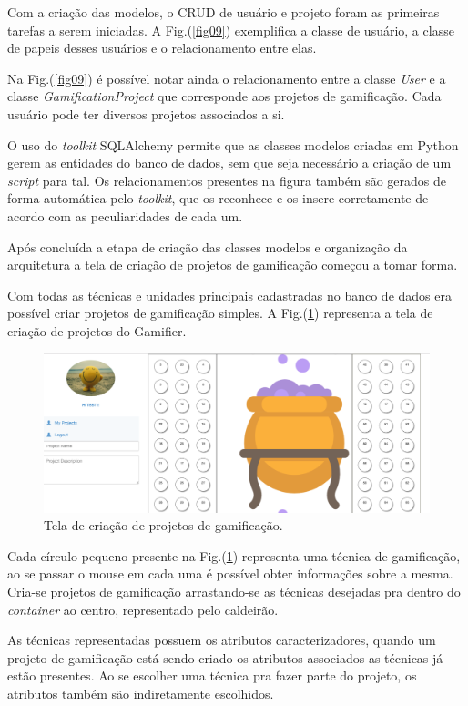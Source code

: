 Com a criação das modelos, o CRUD de usuário e projeto foram as primeiras tarefas a serem iniciadas. A Fig.(\ref{fig09}) exemplifica a classe de usuário, a classe de papeis desses usuários e o relacionamento entre elas. 

Na Fig.(\ref{fig09}) é possível notar ainda o relacionamento entre a classe \textit{User} e a classe \textit{GamificationProject} que corresponde aos projetos de gamificação. Cada usuário pode ter diversos projetos associados a si.


O uso do \textit{toolkit} SQLAlchemy  permite que as classes modelos criadas em Python gerem as entidades do banco de dados, sem que seja necessário a criação de um \textit{script} para tal. Os relacionamentos presentes na figura também são gerados de forma automática pelo \textit{toolkit}, que os reconhece e os insere corretamente de acordo com as peculiaridades de cada um.

Após concluída a etapa de criação das classes modelos e organização da arquitetura a tela de criação de projetos de gamificação começou a tomar forma. 


Com todas as técnicas e unidades principais cadastradas no banco de dados era possível criar projetos de gamificação simples. A Fig.(\ref{fig10}) representa a tela de criação de projetos do Gamifier.


\begin{figure}[h]
	\centering
		\includegraphics[keepaspectratio=true,scale=0.4]{figuras/telainicial.png}
	\caption{Tela de criação de projetos de gamificação.\label{fig10}}
\end{figure}


Cada círculo pequeno presente na Fig.(\ref{fig10}) representa uma técnica de gamificação, ao se passar o mouse em cada uma é possível obter informações sobre a mesma. Cria-se projetos de gamificação arrastando-se as técnicas desejadas pra dentro do \textit{container} ao centro, representado pelo caldeirão.

As técnicas representadas possuem os atributos caracterizadores, quando um projeto de gamificação está sendo criado os atributos associados as técnicas já estão presentes. Ao se escolher uma técnica pra fazer parte do projeto, os atributos também são indiretamente escolhidos.

